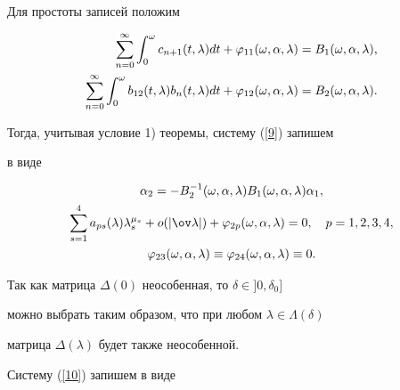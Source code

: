 \begin{pf}
\begin{gather}
\end{gather}


Для простоты записей положим


\begin{align*}


\ds\sum_{n=0}^\infty \ds\int_0^\omega c_{n+1} (t,\lambda)dt+


\varphi_{11} (\omega,\alpha,\lambda)&=B_1 (\omega,\alpha,\lambda),\\


\ds\sum_{n=0}^\infty \ds\int_0^\omega b_{12} (t,\lambda)b_n (t,\lambda)dt


+\varphi_{12} (\omega,\alpha,\lambda) &=B_2 (\omega,\alpha,\lambda).


\end{align*}


Тогда, учитывая условие 1) теоремы, систему (\ref{9}) запишем


в виде


\begin{gather}


\alpha_2 = - B_2^{- 1}


(\omega,\alpha,\lambda)B_1 (\omega,\alpha,\lambda)\alpha_1, \notag \\


\label{10}


\sum_{s=1}^4 {a_{ps}(\lambda)\lambda_s^{\mu_s}}+


o(|\ov \lambda |)+\varphi_{2p} (\omega,\alpha,\lambda)=0,


\quad p=1,2,3,4,\\


%


\varphi_{23} (\omega,\alpha,\lambda) \equiv


\varphi_{24} (\omega,\alpha,\lambda) \equiv 0. \notag


\end{gather}





Так как матрица $\Delta (0)$ неособенная, то $\delta \in]0,\delta_0]$


можно выбрать таким образом, что при любом $\lambda \in \Lambda (\delta)$


матрица $\Delta (\lambda)$ будет также неособенной.





Систему (\ref{10}) запишем в виде


\begin{gather*}



\end{gather*}
\end{pf}
